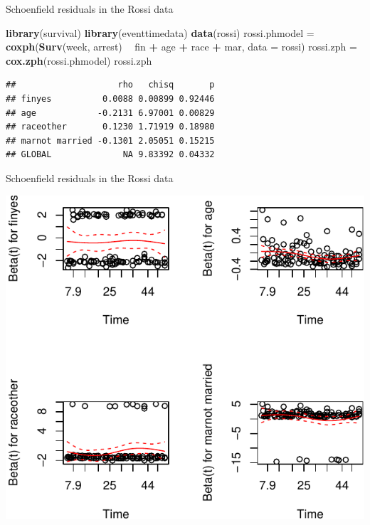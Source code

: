 \documentclass[ignorenonframetext,]{beamer}
\newenvironment{Shaded}{\begin{snugshade}}{\end{snugshade}}
\newcommand{\DataTypeTok}[1]{\textcolor[rgb]{0.13,0.29,0.53}{#1}}
\newcommand{\KeywordTok}[1]{\textcolor[rgb]{0.13,0.29,0.53}{\textbf{#1}}}
\newcommand{\NormalTok}[1]{#1}
\newcommand{\OperatorTok}[1]{\textcolor[rgb]{0.81,0.36,0.00}{\textbf{#1}}}
\newcommand{\StringTok}[1]{\textcolor[rgb]{0.31,0.60,0.02}{#1}}
\begin{document}
\begin{frame}[fragile]{%
\protect\hypertarget{schoenfield-residuals-in-the-rossi-data}{%
Schoenfield residuals in the Rossi data}}

\footnotesize

\begin{Shaded}
\begin{Highlighting}[]
\KeywordTok{library}\NormalTok{(survival)}
\KeywordTok{library}\NormalTok{(eventtimedata)}
\KeywordTok{data}\NormalTok{(rossi)}
\NormalTok{rossi.phmodel =}\StringTok{ }\KeywordTok{coxph}\NormalTok{(}\KeywordTok{Surv}\NormalTok{(week, arrest) }\OperatorTok{~}\StringTok{ }\NormalTok{fin }\OperatorTok{+}\StringTok{ }\NormalTok{age }\OperatorTok{+}\StringTok{ }\NormalTok{race }\OperatorTok{+}\StringTok{ }\NormalTok{mar, }
                      \DataTypeTok{data =}\NormalTok{ rossi)}
\NormalTok{rossi.zph =}\StringTok{ }\KeywordTok{cox.zph}\NormalTok{(rossi.phmodel)}
\NormalTok{rossi.zph}
\end{Highlighting}
\end{Shaded}

\begin{verbatim}
##                    rho   chisq       p
## finyes          0.0088 0.00899 0.92446
## age            -0.2131 6.97001 0.00829
## raceother       0.1230 1.71919 0.18980
## marnot married -0.1301 2.05051 0.15215
## GLOBAL              NA 9.83392 0.04332
\end{verbatim}

\end{frame}

\begin{frame}{%
\protect\hypertarget{schoenfield-residuals-in-the-rossi-data-1}{%
Schoenfield residuals in the Rossi data}}

\small

\includegraphics{unit_05_ph_reg_spec_topics_files/figure-beamer/unnamed-chunk-10-1.pdf}

\end{frame}
\end{document}
